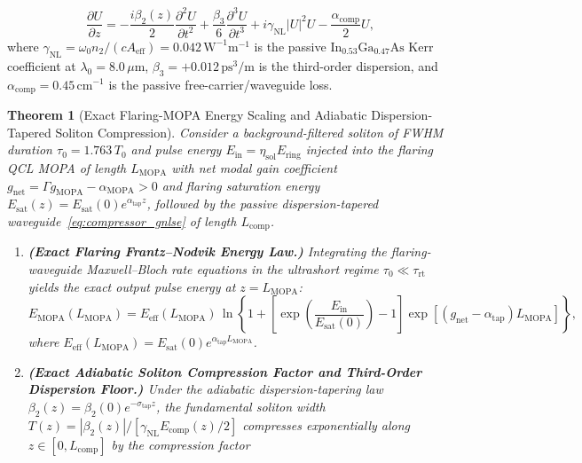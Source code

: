 \documentclass[11pt,letterpaper]{article}
\newtheorem{theorem}{Theorem}
\begin{document}
\begin{enumerate}
    \begin{equation}
    \frac{\partial U}{\partial z} = -\frac{i\beta_2(z)}{2}\frac{\partial^2 U}{\partial t^2} + \frac{\beta_3}{6}\frac{\partial^3 U}{\partial t^3} + i\gamma_{\mathrm{NL}}|U|^2 U - \frac{\alpha_{\mathrm{comp}}}{2}U,
    \label{eq:compressor_gnlse}
    \end{equation}
    where $\gamma_{\mathrm{NL}} = \omega_0 n_2 / (c A_{\mathrm{eff}}) = 0.042\,\mathrm{W^{-1}m^{-1}}$ is the passive $\mathrm{In}_{0.53}\mathrm{Ga}_{0.47}\mathrm{As}$ Kerr coefficient at $\lambda_0 = 8.0\,\mu\mathrm{m}$, $\beta_3 = +0.012\,\mathrm{ps^3/m}$ is the third-order dispersion, and $\alpha_{\mathrm{comp}} = 0.45\,\mathrm{cm}^{-1}$ is the passive free-carrier/waveguide loss.
\end{enumerate}

\begin{theorem}[Exact Flaring-MOPA Energy Scaling and Adiabatic Dispersion-Tapered Soliton Compression]
\label{thm:mopa_compression}
Consider a background-filtered soliton of FWHM duration $\tau_0 = 1.763\,T_0$ and pulse energy $E_{\mathrm{in}} = \eta_{\mathrm{sol}}E_{\mathrm{ring}}$ injected into the flaring QCL MOPA of length $L_{\mathrm{MOPA}}$ with net modal gain coefficient $g_{\mathrm{net}} = \Gamma g_{\mathrm{MOPA}} - \alpha_{\mathrm{MOPA}} > 0$ and flaring saturation energy $E_{\mathrm{sat}}(z) = E_{\mathrm{sat}}(0)e^{\alpha_{\mathrm{tap}} z}$, followed by the passive dispersion-tapered waveguide~\eqref{eq:compressor_gnlse} of length $L_{\mathrm{comp}}$.
\begin{enumerate}
    \item[(a)] \textbf{(Exact Flaring Frantz--Nodvik Energy Law.)} Integrating the flaring-waveguide Maxwell--Bloch rate equations in the ultrashort regime $\tau_0 \ll \tau_{\mathrm{rt}}$ yields the exact output pulse energy at $z = L_{\mathrm{MOPA}}$:
    \begin{equation}
    E_{\mathrm{MOPA}}(L_{\mathrm{MOPA}}) = E_{\mathrm{eff}}(L_{\mathrm{MOPA}})\,\ln\!\left\{ 1 + \left[ \exp\!\left(\frac{E_{\mathrm{in}}}{E_{\mathrm{sat}}(0)}\right) - 1 \right] \exp\!\left[ \left(g_{\mathrm{net}} - \alpha_{\mathrm{tap}}\right) L_{\mathrm{MOPA}} \right] \right\},
    \label{eq:thm2_mopa_energy}
    \end{equation}
    where $E_{\mathrm{eff}}(L_{\mathrm{MOPA}}) = E_{\mathrm{sat}}(0)e^{\alpha_{\mathrm{tap}} L_{\mathrm{MOPA}}}$.
    \item[(b)] \textbf{(Exact Adiabatic Soliton Compression Factor and Third-Order Dispersion Floor.)} Under the adiabatic dispersion-tapering law $\beta_2(z) = \beta_2(0)e^{-\sigma_{\mathrm{tap}} z}$, the fundamental soliton width $T(z) = |\beta_2(z)| / [\gamma_{\mathrm{NL}} E_{\mathrm{comp}}(z)/2]$ compresses exponentially along $z \in [0, L_{\mathrm{comp}}]$ by the compression factor

\end{enumerate}
\end{theorem}
\end{document}
